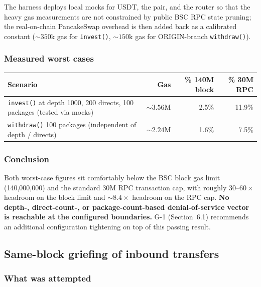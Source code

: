 \documentclass[11pt,a4paper]{article}
\begin{document}
The harness deploys local mocks for USDT, the pair, and the router so that
the heavy gas measurements are not constrained by public BSC RPC state
pruning; the real-on-chain PancakeSwap overhead is then added back as a
calibrated constant (${\sim}350\text{k}$ gas for \texttt{invest()},
${\sim}150\text{k}$ gas for ORIGIN-branch \texttt{withdraw()}).

\subsubsection*{Measured worst cases}

\begin{center}
\renewcommand{\arraystretch}{1.3}
\begin{tabular}{p{7.0cm} r r r}
\toprule
\textbf{Scenario} & \textbf{Gas} & \textbf{\% 140M block} & \textbf{\% 30M RPC} \\
\midrule
\texttt{invest()} at depth 1000, 200 directs, 100 packages (tested via mocks)
                                                     & ${\sim}3.56\text{M}$ & 2.5\%  & 11.9\% \\
\texttt{withdraw()} 100 packages (independent of depth / directs)
                                                     & ${\sim}2.24\text{M}$ & 1.6\%  &  7.5\% \\
\bottomrule
\end{tabular}
\end{center}

\subsubsection*{Conclusion}

Both worst-case figures sit comfortably below the BSC block gas limit
(140{,}000{,}000) and the standard 30M RPC transaction cap, with roughly
$30$--$60\times$ headroom on the block limit and $\sim 8.4\times$ headroom
on the RPC cap. \textbf{No depth-, direct-count-, or package-count-based
denial-of-service vector is reachable at the configured boundaries.}
G-1 (Section~6.1) recommends an additional configuration tightening on top
of this passing result.

\subsection{Same-block griefing of inbound transfers}

\subsubsection*{What was attempted}
\end{document}

